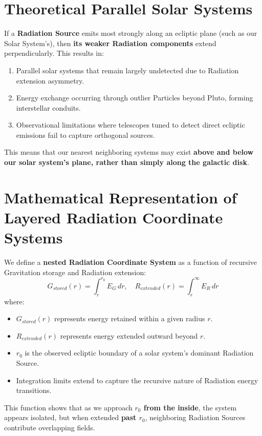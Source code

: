 \documentclass{article}
\begin{document}
\section{Theoretical Parallel Solar Systems}
If a \textbf{Radiation Source} emits most strongly along an ecliptic plane (such as our Solar System’s), then \textbf{its weaker Radiation components} extend perpendicularly. This results in:
\begin{enumerate}
    \item Parallel solar systems that remain largely undetected due to Radiation extension asymmetry.
    \item Energy exchange occurring through outlier Particles beyond Pluto, forming interstellar conduits.
    \item Observational limitations where telescopes tuned to detect direct ecliptic emissions fail to capture orthogonal sources.
\end{enumerate}
This means that our nearest neighboring systems may exist \textbf{above and below our solar system’s plane, rather than simply along the galactic disk}.

\section{Mathematical Representation of Layered Radiation Coordinate Systems}
We define a \textbf{nested Radiation Coordinate System} as a function of recursive Gravitation storage and Radiation extension:
\begin{equation}
    G_{stored}(r) = \int_{r}^{r_0} E_{G} \, dr, \quad R_{extended}(r) = \int_{r}^{\infty} E_{R} \, dr
\end{equation}
where:
\begin{itemize}
    \item $G_{stored}(r)$ represents energy retained within a given radius $r$.
    \item $R_{extended}(r)$ represents energy extended outward beyond $r$.
    \item $r_0$ is the observed ecliptic boundary of a solar system’s dominant Radiation Source.
    \item Integration limits extend to capture the recursive nature of Radiation energy transitions.
\end{itemize}
This function shows that as we approach \textbf{$r_0$ from the inside}, the system appears isolated, but when extended \textbf{past $r_0$}, neighboring Radiation Sources contribute overlapping fields.
\end{document}
